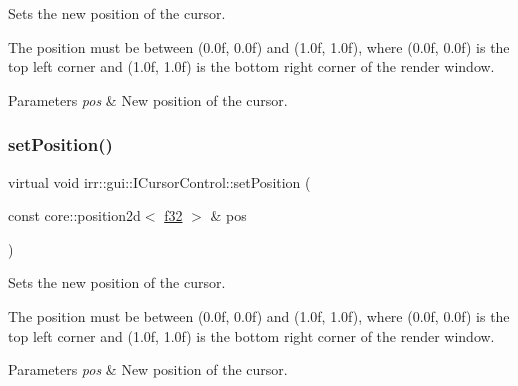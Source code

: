 Sets the new position of the cursor. 

The position must be between (0.\+0f, 0.\+0f) and (1.\+0f, 1.\+0f), where (0.\+0f, 0.\+0f) is the top left corner and (1.\+0f, 1.\+0f) is the bottom right corner of the render window. 
\begin{DoxyParams}{Parameters}
{\em pos} & New position of the cursor. \\
\hline
\end{DoxyParams}
\mbox{\label{classirr_1_1gui_1_1ICursorControl_a951b5afe97fa21d98ce5360d96314306}} 
\subsubsection{\texorpdfstring{set\+Position()}{setPosition()}\hspace{0.1cm}{\footnotesize\ttfamily [2/8]}}
{\footnotesize\ttfamily virtual void irr\+::gui\+::\+I\+Cursor\+Control\+::set\+Position (\begin{DoxyParamCaption}\item[{const core\+::position2d$<$ \hyperlink{namespaceirr_a0277be98d67dc26ff93b1a6a1d086b07}{f32} $>$ \&}]{pos }\end{DoxyParamCaption})\hspace{0.3cm}{\ttfamily [pure virtual]}}



Sets the new position of the cursor. 

The position must be between (0.\+0f, 0.\+0f) and (1.\+0f, 1.\+0f), where (0.\+0f, 0.\+0f) is the top left corner and (1.\+0f, 1.\+0f) is the bottom right corner of the render window. 
\begin{DoxyParams}{Parameters}
{\em pos} & New position of the cursor. \\
\hline
\end{DoxyParams}
\mbox{\label{classirr_1_1gui_1_1ICursorControl_adca41054684f73435c9b045520f7c83b}} 
